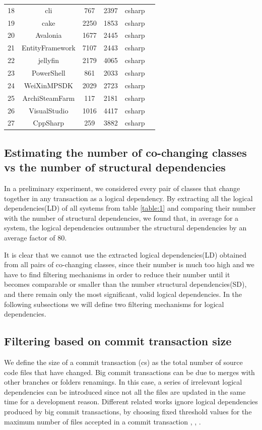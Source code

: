 \documentclass[conference]{IEEEtran}
\begin{document}
\begin{table}[!h]
\begin{tabular}{|c|c|c|c|c|c|}
18	&	cli	&	767	&	2397	&	csharp	\\
19	&	cake	&	2250	&	1853	&	csharp	\\
20	&	Avalonia	&	1677	&	2445	&	csharp	\\
21	&	EntityFramework	&	7107	&	2443	&	csharp	\\
22	&	jellyfin	&	2179	&	4065	&	csharp	\\
23	&	PowerShell	&	861	&	2033	&	csharp	\\
24	&	WeiXinMPSDK	&	2029	&	2723	&	csharp	\\
25	&	ArchiSteamFarm	&	117	&	2181	&	csharp	\\
26	&	VisualStudio	&	1016	&	4417	&	csharp	\\
27	&	CppSharp	&	259	&	3882	&	csharp	\\
\hline
\end{tabular}
\end{table}

\subsection{Estimating the number of co-changing classes vs the number of structural dependencies}
\label{sec:preliminary}

In a preliminary experiment, we considered every pair of classes that change together in any transaction  as a logical dependency. By extracting all the logical dependencies(LD) of all systems from table \ref{table:1} and comparing  their number with the number of structural dependencies,  we found that, in average for a system,  the logical dependencies outnumber the structural dependencies by an average factor of 80.  

It is clear that we cannot use the extracted logical dependencies(LD) obtained from all pairs of co-changing classes, since their number is much too high and we have to find filtering mechanisms in order to reduce their number until it becomes comparable or smaller than the number structural dependencies(SD), and there remain only the most significant, valid logical dependencies.
In the following subsections we will define two filtering mechanisms for logical dependencies.

\subsection{Filtering based on commit transaction size}

We define the size of a commit transaction (cs) as the total number of source code files that have changed. Big commit transactions can be due to merges with other branches or folders renamings. In this case, a series of irrelevant logical dependencies can be introduced since not all the files are updated in the same time for a development reason. Different related works ignore logical dependencies produced by big commit transactions, by choosing fixed threshold values for the maximum number of files accepted in a commit transaction \cite{DBLP:journals/jss/AjienkaC17}, \cite{DBLP:journals/ese/AjienkaCC18}, \cite{Beck:2011:CMC:2025113.2025162}.
\end{document}

